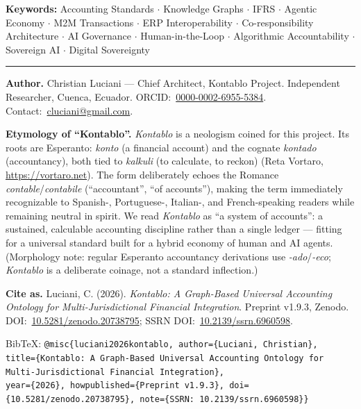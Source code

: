 \vspace{0.8em}
{\small\noindent \textbf{Keywords:} Accounting Standards $\cdot$ Knowledge Graphs $\cdot$ IFRS $\cdot$ Agentic Economy $\cdot$ M2M Transactions $\cdot$ ERP Interoperability $\cdot$ Co-responsibility Architecture $\cdot$ AI Governance $\cdot$ Human-in-the-Loop $\cdot$ Algorithmic Accountability $\cdot$ Sovereign AI $\cdot$ Digital Sovereignty\par}

\vspace{1em}
\noindent\textcolor{clappsAccent}{\rule{\linewidth}{0.4pt}}
\begingroup\scriptsize\raggedright\setlength{\parskip}{0.4em}\par

\noindent\textbf{Author.} Christian Luciani --- Chief Architect, Kontablo Project. Independent Researcher, Cuenca, Ecuador. ORCID:~\href{https://orcid.org/0000-0002-6955-5384}{0000-0002-6955-5384}. Contact:~\href{mailto:cluciani@gmail.com}{cluciani@gmail.com}.

\noindent\textbf{Etymology of ``Kontablo''.} \emph{Kontablo} is a neologism coined for this project. Its roots are Esperanto: \emph{konto} (a financial account) and the cognate \emph{kontado} (accountancy), both tied to \emph{kalkuli} (to calculate, to reckon) (Reta Vortaro, \url{https://vortaro.net}). The form deliberately echoes the Romance \emph{contable}/\emph{contabile} (``accountant'', ``of accounts''), making the term immediately recognizable to Spanish-, Portuguese-, Italian-, and French-speaking readers while remaining neutral in spirit. We read \emph{Kontablo} as ``a system of accounts'': a sustained, calculable accounting discipline rather than a single ledger --- fitting for a universal standard built for a hybrid economy of human and AI agents. (Morphology note: regular Esperanto accountancy derivations use \emph{-ado}/\emph{-eco}; \emph{Kontablo} is a deliberate coinage, not a standard inflection.)

\noindent\textbf{Cite as.} Luciani, C. (2026). \textit{Kontablo: A Graph-Based Universal Accounting Ontology for Multi-Jurisdictional Financial Integration}. Preprint v1.9.3, Zenodo. DOI:~\href{https://doi.org/10.5281/zenodo.20738795}{10.5281/zenodo.20738795}; SSRN DOI:~\href{https://doi.org/10.2139/ssrn.6960598}{10.2139/ssrn.6960598}.

\noindent BibTeX: \texttt{@misc\{luciani2026kontablo, author=\{Luciani, Christian\},}\\
\texttt{title=\{Kontablo: A Graph-Based Universal Accounting Ontology for Multi-Jurisdictional Financial Integration\},}\\
\texttt{year=\{2026\}, howpublished=\{Preprint v1.9.3\}, doi=\{10.5281/zenodo.20738795\}, note=\{SSRN: 10.2139/ssrn.6960598\}\}}
\endgroup
